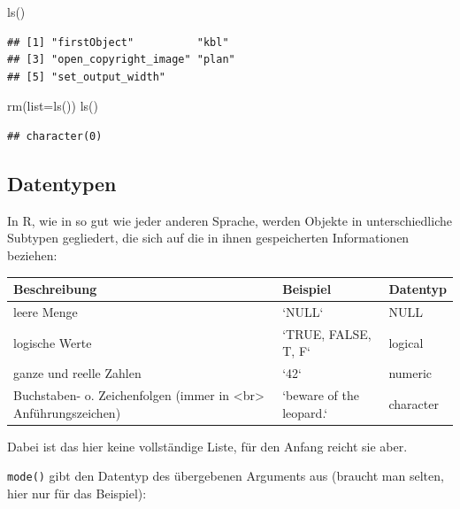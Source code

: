 \documentclass[
]{book}
\newenvironment{Shaded}{\begin{snugshade}}{\end{snugshade}}
\newcommand{\AttributeTok}[1]{\textcolor[rgb]{0.77,0.63,0.00}{#1}}
\newcommand{\FunctionTok}[1]{\textcolor[rgb]{0.00,0.00,0.00}{#1}}
\newcommand{\NormalTok}[1]{#1}
\begin{document}
\begin{Shaded}
\begin{Highlighting}[]
\FunctionTok{ls}\NormalTok{()}
\end{Highlighting}
\end{Shaded}

\begin{verbatim}
## [1] "firstObject"          "kbl"                 
## [3] "open_copyright_image" "plan"                
## [5] "set_output_width"
\end{verbatim}

\begin{Shaded}
\begin{Highlighting}[]
\FunctionTok{rm}\NormalTok{(}\AttributeTok{list=}\FunctionTok{ls}\NormalTok{())}
\FunctionTok{ls}\NormalTok{()}
\end{Highlighting}
\end{Shaded}

\begin{verbatim}
## character(0)
\end{verbatim}

\hypertarget{datentypen}{%
\subsection*{Datentypen}\label{datentypen}}

\small

In R, wie in so gut wie jeder anderen Sprache, werden Objekte in unterschiedliche Subtypen gegliedert, die sich auf die in ihnen gespeicherten Informationen beziehen:

\begin{tabular}[t]{l|l|l}
\hline
Beschreibung & Beispiel & Datentyp\\
\hline
leere Menge & `NULL` & NULL\\
\hline
logische Werte & `TRUE, FALSE, T,  F` & logical\\
\hline
ganze und reelle Zahlen & `42` & numeric\\
\hline
Buchstaben- o. Zeichenfolgen (immer in <br> Anführungszeichen) & `beware of the leopard.` & character\\
\hline
\end{tabular}

Dabei ist das hier keine vollständige Liste, für den Anfang reicht sie aber.

\texttt{mode()} gibt den Datentyp des übergebenen Arguments aus (braucht man selten, hier nur für das Beispiel):
\end{document}
